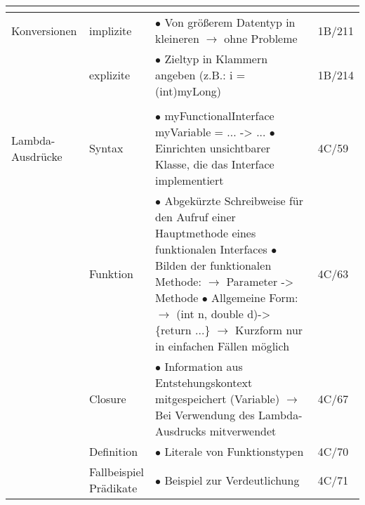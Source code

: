 \documentclass[11pt,a4paper]{article}
\begin{document}
\begin{center}
\begin{longtable}[h]{ | p{2.3cm} | p{2.3cm} | p{12.6cm} | p{1.2cm} | }
	
	
	\multicolumn{3}{c}{} \\ 
	\hline   
	
	
	
	{\large Konversionen} & implizite & $\bullet$ Von größerem Datentyp in kleineren $\rightarrow$ ohne Probleme & 1B/211 \\ \cline{2-4}
	
	& explizite & $\bullet$ Zieltyp in Klammern angeben (z.B.: i = (int)myLong) & 1B/214 \\ \cline{2-4}
	\hline
	
	
	
	\multicolumn{3}{c}{} \\ 
	\hline 
	
	
	
	{\large Lambda-Ausdrücke} & Syntax & \makecell[l]{$\bullet$ myFunctionalInterface myVariable = ... -> ... \\ 
	$\bullet$ Einrichten unsichtbarer Klasse, die das Interface implementiert \\ } & 4C/59 \\ \cline{2-4}
	
	& Funktion & \makecell[l]{ $\bullet$ Abgekürzte Schreibweise für den Aufruf einer Hauptmethode \\ 
	\hspace{0.2cm} eines funktionalen Interfaces\\ 
	$\bullet$ Bilden der funktionalen Methode: \\ \hspace{0.4cm} $\rightarrow$ Parameter -> Methode \\ 
	$\bullet$ Allgemeine Form: \\ \hspace{0.4cm} $\rightarrow$ (int n, double d)-> \{return ...\} \\ 
	\hspace{0.4cm} $\rightarrow$ Kurzform nur in einfachen Fällen möglich} & 4C/63 \\ \cline{2-4}
	
	& Closure & \makecell[l]{$\bullet$ Information aus Entstehungskontext mitgespeichert (Variable) \\ 
	$\rightarrow$ Bei Verwendung des Lambda-Ausdrucks mitverwendet } & 4C/67 \\ \cline{2-4}
	
	& Definition & $\bullet$ Literale von Funktionstypen & 4C/70 \\ \cline{2-4}
	
	& \makecell[l]{Fallbeispiel \\ Prädikate} & $\bullet$ Beispiel zur Verdeutlichung  & 4C/71 \\ 
	\hline
	

\end{longtable}
\end{center}
\end{document}
